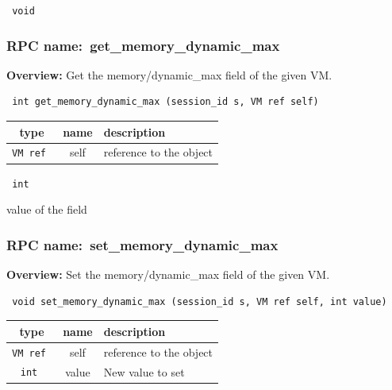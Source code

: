 \vspace{0.3cm}

{\tt 
void
}



\vspace{0.3cm}
\vspace{0.3cm}
\vspace{0.3cm}
\subsubsection{RPC name:~get\_memory\_dynamic\_max}

{\bf Overview:} 
Get the memory/dynamic\_max field of the given VM.

\begin{verbatim} int get_memory_dynamic_max (session_id s, VM ref self)\end{verbatim}



 
\vspace{0.3cm}
\begin{tabular}{|c|c|p{7cm}|}
 \hline
{\bf type} & {\bf name} & {\bf description} \\ \hline
{\tt VM ref } & self & reference to the object \\ \hline 

\end{tabular}

\vspace{0.3cm}

{\tt 
int
}


value of the field
\vspace{0.3cm}
\vspace{0.3cm}
\vspace{0.3cm}
\subsubsection{RPC name:~set\_memory\_dynamic\_max}

{\bf Overview:} 
Set the memory/dynamic\_max field of the given VM.

\begin{verbatim} void set_memory_dynamic_max (session_id s, VM ref self, int value)\end{verbatim}



 
\vspace{0.3cm}
\begin{tabular}{|c|c|p{7cm}|}
 \hline
{\bf type} & {\bf name} & {\bf description} \\ \hline
{\tt VM ref } & self & reference to the object \\ \hline 

{\tt int } & value & New value to set \\ \hline 

\end{tabular}

